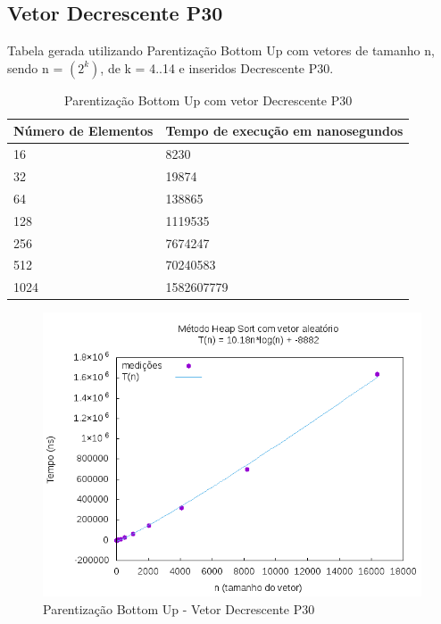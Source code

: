 \documentclass[12pt,a4paper,twoside]{report}
\begin{document}
\subsection{Vetor Decrescente P30}
Tabela gerada utilizando Parentização Bottom Up com vetores de tamanho n, sendo n = $(2^k)$, de k = 4..14 e inseridos Decrescente P30.
\begin{table}[H]
\centering
\caption{Parentização Bottom Up com vetor Decrescente P30}
\label{my-label}
\begin{tabular}{|l|l|}
\hline
\multicolumn{1}{|c|}{\textbf{Número de Elementos}} & \multicolumn{1}{c|}{\textbf{Tempo de execução em nanosegundos}} \\ \hline
16 & 8230 \\ \hline
32 & 19874 \\ \hline
64 & 138865 \\ \hline
128 & 1119535 \\ \hline
256 & 7674247 \\ \hline
512 & 70240583 \\ \hline
1024 & 1582607779 \\ \hline
\end{tabular}
\end{table}

\begin{figure}[H]
    \centering
    \includegraphics[width=0.7\linewidth]{graficos/HeapSort/vIntAleatorio/vIntAleatorio.png}
  \caption{Parentização Bottom Up - Vetor Decrescente P30}
\end{figure}
\end{document}
